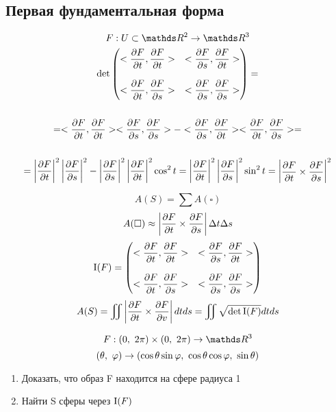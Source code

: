 \documentclass[main]{subfiles}
\begin{document}
    \subsection{Первая фундаментальная форма}

    \begin{Example}
      \[F: U \subset \R^2 \ra \R^3\]
      \begin{multline*}
        $$\det \begin{pmatrix}
          <\dfrac{\d F}{\d t}, \dfrac{\d F}{\d t}> & <\dfrac{\d F}{\d s}, \dfrac{\d F}{\d t}>\\
          \\
          <\dfrac{\d F}{\d t}, \dfrac{\d F}{\d s}> & <\dfrac{\d F}{\d s}, \dfrac{\d F}{\d s}>
        \end{pmatrix} = \\ \\
          = <\frac{\d F}{\d t}, \frac{\d F}{\d t}> <\frac{\d F}{\d s}, \frac{\d F}{\d s}> - <\frac{\d F}{\d s}, \frac{\d F}{\d t}> <\frac{\d F}{\d t}, \dfrac{\d F}{\d s}> =\\ \\
         =\abs{\dfrac{\d F}{\d t}}^2 \abs{\dfrac{\d F}{\d s}}^2 - \abs{\dfrac{\d F}{\d s}}^2 \abs{\dfrac{\d F}{\d t}}^2 \cos^2 t = \abs{\dfrac{\d F}{\d t}}^2 \abs{\dfrac{\d F}{\d s}}^2 \sin^2 t
        = \begin{vmatrix}
          \dfrac{\d F}{\d t} \times \dfrac{\d F}{\d s}
        \end{vmatrix}^2$$
      \end{multline*}
    \end{Example}

    \begin{Remark}
      \[A(S)=\sum A(\square)\]
      \[A(\square) \approx \left|\dfrac{\partial F}{\partial t} \times \dfrac{\partial F}{\partial s}\right| \Delta t \Delta s\]
      \[\RNumb{1}(F)= \begin{pmatrix}
        <\dfrac{\d F}{\d t}, \dfrac{\d F}{\d t}> & <\dfrac{\d F}{\d s}, \dfrac{\d F}{\d t}>\\
        \\
        <\dfrac{\d F}{\d t}, \dfrac{\d F}{\d s}> & <\dfrac{\d F}{\d s}, \dfrac{\d F}{\d s}>
      \end{pmatrix}\]
      \[A(S)= \iint \abs{\dfrac{\d F}{\d t} \times \dfrac{\d F}{\d v}} dt ds = \iint \sqrt{\det \RNumb{1}(F)} dt ds\]
    \end{Remark}

    \begin{Task}
      \[F: (0,\ 2\pi) \times (0,\ 2\pi) \ra \R^3\]
      \[(\theta,\ \varphi) \rightarrow (\cos \theta \sin \varphi,\ \cos \theta \cos \varphi,\ \sin \theta)\]
      \begin{enumerate}
        \item Доказать, что образ F находится на сфере радиуса 1
        \item Найти S сферы через $\RNumb{1}(F)$
      \end{enumerate}
    \end{Task}
\end{document}
